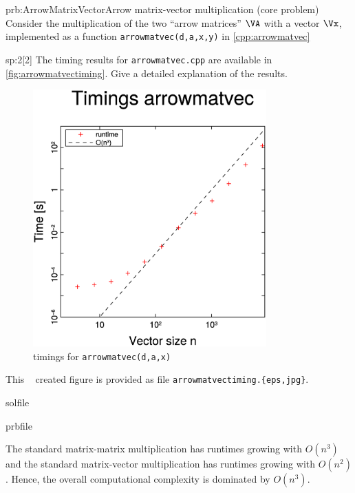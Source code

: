 \begin{samproblem}{prb:ArrowMatrixVector}{Arrow matrix-vector multiplication (core problem)}{
Consider the multiplication of the two ``arrow matrices'' $\VA$ with a vector $\Vx$,
implemented as a function \texttt{arrowmatvec(d,a,x,y)} in \cref{cpp:arrowmatvec}
}

\begin{subproblem}{sp:2}[2]
  The timing results for \texttt{arrowmatvec.cpp} are available in \autoref{fig:arrowmatvectiming}. 
  Give a detailed explanation of the results.

  \begin{figure}[ht]
    \centering
    \includegraphics[width=0.8\textwidth]{Chapters/MatrixVector/PICTURES/arrowmatvectiming.eps}
    \caption{timings for \texttt{arrowmatvec(d,a,x)}}
    \label{fig:arrowmatvectiming}
  \end{figure}

  \begin{hint}
    This \cpp~ created figure is provided as file
    \texttt{arrowmatvectiming.\{eps,jpg\}}.
  \end{hint}

  \begin{samwriteprbpart}{solfile}
    \begin{writeverbatim}{prbfile}
      \begin{samsolution}
      The standard matrix-matrix multiplication has runtimes growing with $O(n^3)$ 
      and the standard matrix-vector multiplication has runtimes growing with $O(n^2)$. 
      Hence, the overall computational complexity is dominated by $O(n^3)$.
      \end{samsolution}
    \end{writeverbatim}
  \end{samwriteprbpart}
\end{subproblem}


\end{samproblem}
